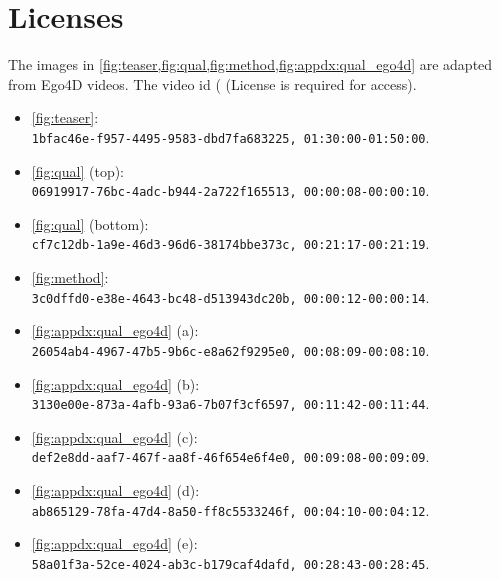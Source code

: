 \documentclass[10pt,twocolumn,letterpaper]{article}
\begin{document}
\section{Licenses}
The images in \cref{fig:teaser,fig:qual,fig:method,fig:appdx:qual_ego4d} are adapted from Ego4D videos.
The video id (\texttt{\vid} (License is required for access).
\begin{itemize}
	\item \cref{fig:teaser}: \\ \texttt{1bfac46e-f957-4495-9583-dbd7fa683225, 01:30:00-01:50:00}.
	\item \cref{fig:qual} (top): \\ \texttt{06919917-76bc-4adc-b944-2a722f165513, 00:00:08-00:00:10}.
	\item \cref{fig:qual} (bottom): \\ \texttt{cf7c12db-1a9e-46d3-96d6-38174bbe373c, 00:21:17-00:21:19}.
	\item \cref{fig:method}: \\ \texttt{3c0dffd0-e38e-4643-bc48-d513943dc20b, 00:00:12-00:00:14}.
	\item \cref{fig:appdx:qual_ego4d} (a): \\ \texttt{26054ab4-4967-47b5-9b6c-e8a62f9295e0, 00:08:09-00:08:10}.
	\item \cref{fig:appdx:qual_ego4d} (b): \\ \texttt{3130e00e-873a-4afb-93a6-7b07f3cf6597, 00:11:42-00:11:44}.
	\item \cref{fig:appdx:qual_ego4d} (c): \\ \texttt{def2e8dd-aaf7-467f-aa8f-46f654e6f4e0, 00:09:08-00:09:09}.
	\item \cref{fig:appdx:qual_ego4d} (d): \\ \texttt{ab865129-78fa-47d4-8a50-ff8c5533246f, 00:04:10-00:04:12}.
	\item \cref{fig:appdx:qual_ego4d} (e): \\ \texttt{58a01f3a-52ce-4024-ab3c-b179caf4dafd, 00:28:43-00:28:45}.
\end{itemize}

 
\end{document}

